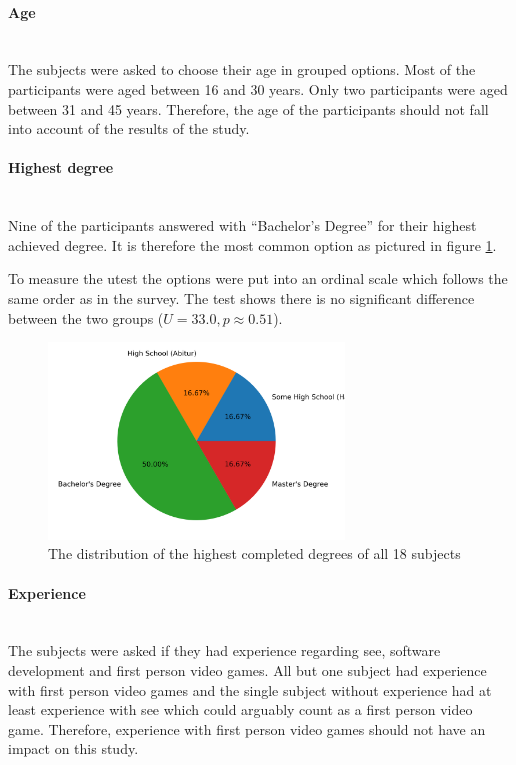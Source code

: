 \paragraph{Age}\mbox{}\\
The subjects were asked to choose their age in grouped options. 
Most of the participants were aged between 16 and 30 years.
Only two participants were aged between 31 and 45 years. 
Therefore, the age of the participants should not fall into account of the results of the study.

\paragraph{Highest degree}\mbox{}\\
Nine of the participants answered with \enquote{Bachelor's Degree} for their highest achieved degree. 
It is therefore the most common option as pictured in figure \ref{fig:degree}.

To measure the \gls{utest} the options were put into an ordinal scale which follows the same order as in the survey.
The test shows there is no significant difference between the two groups ($U = 33.0, p \approx 0.51$).

\begin{figure}[H]
  \centering
  \includegraphics[width=0.7\textwidth]{Evaluation/img/degree.png}
  \caption{The distribution of the highest completed degrees of all 18 subjects}\label{fig:degree}
\end{figure}

\paragraph{Experience}\mbox{}\\
The subjects were asked if they had experience regarding \gls{see}, software development and first person video games.
All but one subject had experience with first person video games and the single subject without experience had at least experience with \gls{see} which could arguably count as a first person video game.
Therefore, experience with first person video games should not have an impact on this study.

